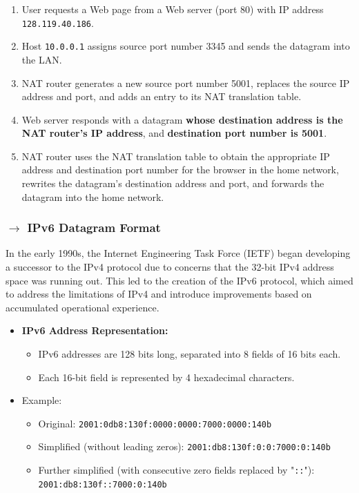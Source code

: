 \begin{enumerate}
    \item User requests a Web page from a Web server (port 80) with IP address \texttt{128.119.40.186}.
    \item Host \texttt{10.0.0.1} assigns source port number 3345 and sends the datagram into the LAN.
    \item NAT router generates a new source port number 5001, replaces the source IP address and port, and adds an entry to its NAT translation table.
    \item Web server responds with a datagram \textbf{whose destination address is the NAT router's IP address}, and \textbf{destination port number is 5001}.
    \item NAT router uses the NAT translation table to obtain the appropriate IP address and destination port number for the browser in the home network, rewrites the datagram's destination address and port, and forwards the datagram into the home network.
\end{enumerate}

\clearpage
\subsubsection[4.4.5 IPv6 Datagram Format]{$\rightarrow$ IPv6 Datagram Format}

In the early 1990s, the Internet Engineering Task Force (IETF) began developing a successor to the IPv4 protocol due to concerns that the 32-bit IPv4 address space was running out. This led to the creation of the IPv6 protocol, which aimed to address the limitations of IPv4 and introduce improvements based on accumulated operational experience.

\begin{mdframed}
    \begin{itemize}[nolistsep, noitemsep]
        \item \textbf{IPv6 Address Representation:}
        \begin{itemize}[nolistsep, noitemsep]
            \item IPv6 addresses are 128 bits long, separated into 8 fields of 16 bits each.
            \item Each 16-bit field is represented by 4 hexadecimal characters.
        \end{itemize}
        \item Example:
        \begin{itemize}[nolistsep, noitemsep]
            \item Original: \texttt{2001:0db8:130f:0000:0000:7000:0000:140b}
            \item Simplified (without leading zeros): \texttt{2001:db8:130f:0:0:7000:0:140b}
            \item Further simplified (with consecutive zero fields replaced by "\texttt{::}"): \texttt{2001:db8:130f::7000:0:140b}
        \end{itemize}
    \end{itemize}
\end{mdframed}

